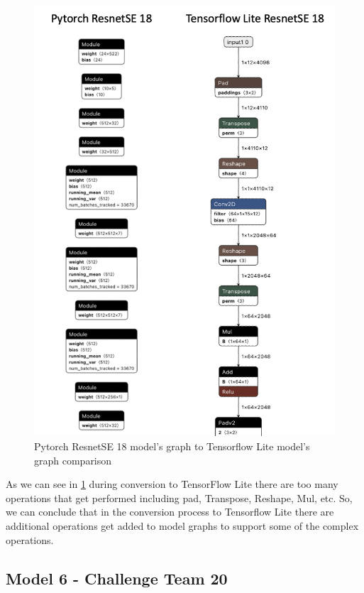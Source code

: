 \begin{figure}[H]
\centering
\includegraphics[scale=0.7]{img/resnetse_conversion_comparison.png}
\caption{Pytorch ResnetSE 18 model's graph to Tensorflow Lite model's graph comparison }
\label{resenet18_conversion_comparison}
\end{figure}

As we can see in \ref{resenet18_conversion_comparison} during conversion to TensorFlow Lite there are too many operations that get performed including pad, Transpose, Reshape, Mul, etc. So, we can conclude that in the conversion process to Tensorflow Lite there are additional operations get added to model graphs to support some of the complex operations. 


\subsection{Model 6 - Challenge Team 20}\label{5CTLM6}

